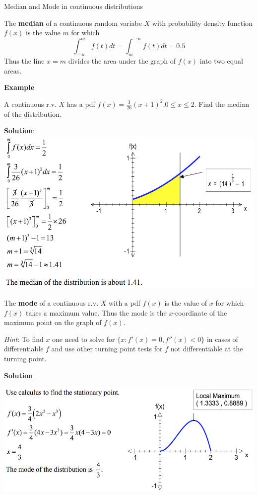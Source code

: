 \documentclass[ignorenonframetext,]{beamer}
\begin{document}
\begin{frame}{Median and Mode in continuous distributions}

The \textbf{median} of a continuous random variabe \(X\) with
probability density function \(f(x)\) is the value \(m\) for which
\[\int^m_{-\infty}f(t)dt=\int^{-\infty}_mf(t)dt=0.5\] Thus the line
\(x=m\) divides the area under the graph of \(f(x)\) into two equal
areas.

\textbf{Example}

A continuous r.v. \(X\) has a pdf
\(f(x)=\frac{3}{26}(x+1)^2\),\(0\le x\le 2\). Find the median of the
distribution.

\textbf{Solution}: \includegraphics{mediancont.png}

The \textbf{mode} of a continuous r.v. \(X\) with a pdf \(f(x)\) is the
value of \(x\) for which \(f(x)\) takes a maximum value. Thus the mode
is the \(x\)-coordinate of the maximum point on the graph of \(f(x)\).

\emph{Hint}: To find \(x\) one need to solve for
\(\{x:f'(x)=0,f''(x)<0\}\) in cases of differentiable \(f\) and use
other turning point tests for \(f\) not differentiable at the turning
point.

\textbf{Solution}

 \includegraphics{modecont.png}

\end{frame}
\end{document}
